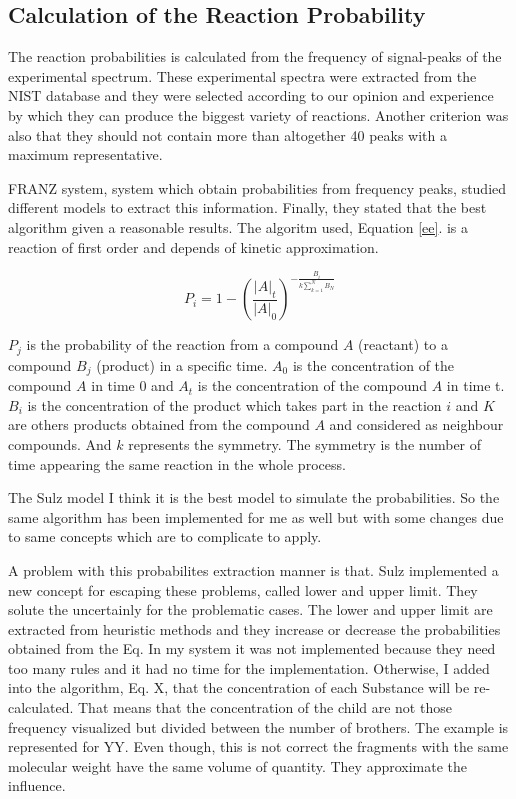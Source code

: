 \documentclass[10pt]{bmc_article}
\newenvironment{bmcformat}{\begin{raggedright}\baselineskip20pt\sloppy\setboolean{publ}{false}}{\end{raggedright}\baselineskip20pt\sloppy}
\begin{document}
\begin{bmcformat}
\subsection{Calculation of the Reaction Probability}

The reaction probabilities is calculated from the frequency of signal-peaks of 
the experimental spectrum. These experimental spectra were extracted from the 
NIST \cite{NIST2007} database and they were selected according to our opinion and 
experience by which they can produce the biggest variety of reactions. Another 
criterion was also that they should not contain more than altogether 40 peaks 
with a maximum representative.

FRANZ system, system which obtain probabilities from frequency peaks, studied 
different models to extract this information. Finally, they stated that the 
best algorithm given a reasonable results. The algoritm used, Equation 
\ref{ee}. is a reaction of first order and depends of kinetic approximation.

\begin{equation}
\label{ee}
P_i = 1-\left( \frac{\left |A \right 
|_t}{\left|A\right|_0}\right)^{-\frac{\textstyle B_{i}}{\textstyle k 
\sum_{k=1}^N B_{N}}}
\end{equation}

$P_{j}$ is the probability of the reaction from a compound $A$ (reactant) to a 
compound $B_{j}$ (product) in a specific time. $A_{0}$ is the concentration of 
the compound $A$ in time 0 and $A_{t}$ is the concentration of the compound $A$ 
in time t. $B_{i}$ is the concentration of the product which takes part in the 
reaction $i$ and $K$ are others products obtained from the compound $A$ and 
considered as neighbour compounds. And $k$ represents the symmetry. The 
symmetry is the number of time appearing the same reaction in the whole process.

The Sulz model I think it is the best model to simulate the probabilities. So 
the same algorithm has been implemented for me as well but with some changes 
due to same concepts which are to complicate to apply.

A problem with this probabilites extraction manner is that. Sulz implemented a 
new concept for escaping these problems, called lower and upper limit. They 
solute the uncertainly for the problematic cases. The lower and upper limit are 
extracted from heuristic methods and they increase or decrease the 
probabilities obtained from the Eq. In my system it was not implemented because 
they need too many rules and it had no time for the implementation. Otherwise, 
I added into the algorithm, Eq. X, that the concentration of each Substance 
will be re-calculated. That means that the concentration of the  child are not 
those frequency visualized but divided between the number of brothers. The 
example is represented for YY. Even though, this is not correct  the fragments 
with the same molecular weight have the same volume of quantity. They 
approximate the influence.



\end{bmcformat}
\end{document}
